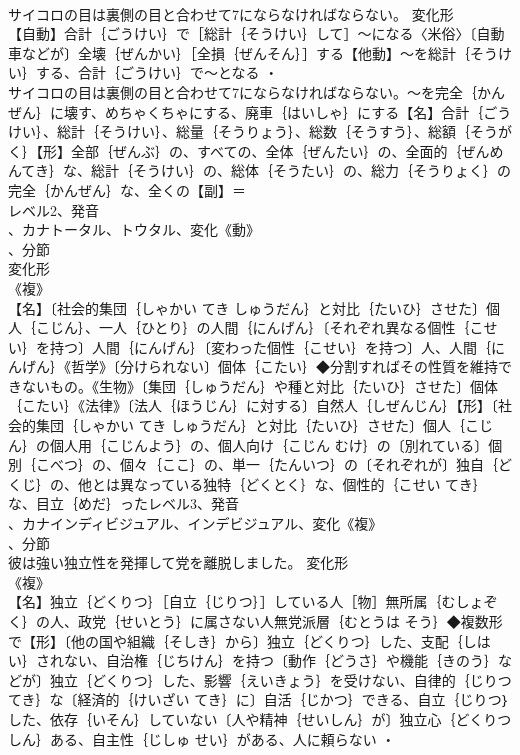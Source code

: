 \documentclass[8pt]{extreport}
\begin{document}
\begin{CJK}{UTF8}{min}
\\	サイコロの目は裏側の目と合わせて7にならなければならない。	変化形 
\\	【自動】合計｛ごうけい｝で［総計｛そうけい｝して］～になる〈米俗〉〔自動車などが〕全壊｛ぜんかい｝［全損｛ぜんそん｝］する【他動】～を総計｛そうけい｝する、合計｛ごうけい｝で～となる ・
\\	サイコロの目は裏側の目と合わせて7にならなければならない。～を完全｛かんぜん｝に壊す、めちゃくちゃにする、廃車｛はいしゃ｝にする【名】合計｛ごうけい｝、総計｛そうけい｝、総量｛そうりょう｝、総数｛そうすう｝、総額｛そうがく｝【形】全部｛ぜんぶ｝の、すべての、全体｛ぜんたい｝の、全面的｛ぜんめんてき｝な、総計｛そうけい｝の、総体｛そうたい｝の、総力｛そうりょく｝の完全｛かんぜん｝な、全くの【副】＝ 
\\	レベル2、発音
\\	、カナトータル、トウタル、変化《動》
\\	、分節
\\	変化形 
\\	《複》
\\	【名】〔社会的集団｛しゃかい てき しゅうだん｝と対比｛たいひ｝させた〕個人｛こじん｝、一人｛ひとり｝の人間｛にんげん｝〔それぞれ異なる個性｛こせい｝を持つ〕人間｛にんげん｝〔変わった個性｛こせい｝を持つ〕人、人間｛にんげん｝《哲学》〔分けられない〕個体｛こたい｝◆分割すればその性質を維持できないもの。《生物》〔集団｛しゅうだん｝や種と対比｛たいひ｝させた〕個体｛こたい｝《法律》〔法人｛ほうじん｝に対する〕自然人｛しぜんじん｝【形】〔社会的集団｛しゃかい てき しゅうだん｝と対比｛たいひ｝させた〕個人｛こじん｝の個人用｛こじんよう｝の、個人向け｛こじん むけ｝の〔別れている〕個別｛こべつ｝の、個々｛ここ｝の、単一｛たんいつ｝の〔それぞれが〕独自｛どくじ｝の、他とは異なっている独特｛どくとく｝な、個性的｛こせい てき｝な、目立｛めだ｝ったレベル3、発音
\\	、カナインディビジュアル、インデビジュアル、変化《複》
\\	、分節
\\	彼は強い独立性を発揮して党を離脱しました。	変化形 
\\	《複》
\\	【名】独立｛どくりつ｝［自立｛じりつ｝］している人［物］無所属｛むしょぞく｝の人、政党｛せいとう｝に属さない人無党派層｛むとうは そう｝◆複数形で【形】〔他の国や組織｛そしき｝から〕独立｛どくりつ｝した、支配｛しはい｝されない、自治権｛じちけん｝を持つ〔動作｛どうさ｝や機能｛きのう｝などが〕独立｛どくりつ｝した、影響｛えいきょう｝を受けない、自律的｛じりつ てき｝な〔経済的｛けいざい てき｝に〕自活｛じかつ｝できる、自立｛じりつ｝した、依存｛いそん｝していない〔人や精神｛せいしん｝が〕独立心｛どくりつしん｝ある、自主性｛じしゅ せい｝がある、人に頼らない ・

\end{CJK}
\end{document}
